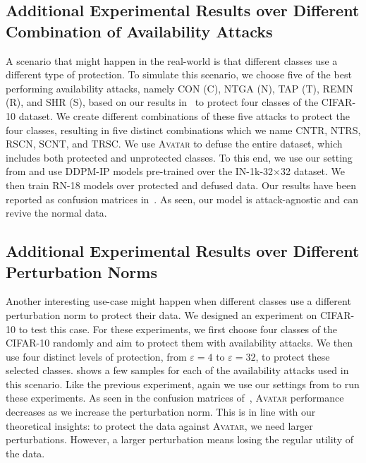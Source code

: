 \documentclass[conference]{IEEEtran}
\theoremstyle{definition}
\theoremstyle{remark}
\theoremstyle{proposition}
\begin{document}
\subsection{Additional Experimental Results over Different Combination of Availability Attacks}

A scenario that might happen in the real-world is that different classes use a different type of protection.
To simulate this scenario, we choose five of the best performing availability attacks, namely CON (C), NTGA (N), TAP (T), REMN (R), and SHR (S), based on our results in~ to protect four classes of the CIFAR-10 dataset.
We create different combinations of these five attacks to protect the four classes, resulting in five distinct combinations which we name CNTR, NTRS, RSCN, SCNT, and TRSC.
We use \textsc{Avatar} to defuse the entire dataset, which includes both protected and unprotected classes.
To this end, we use our setting from  and use DDPM-IP models pre-trained over the IN-1k-32$\times$32 dataset.
We then train RN-18 models over protected and defused data.
Our results have been reported as confusion matrices in~.
As seen, our model is attack-agnostic and can revive the normal data.

\subsection{Additional Experimental Results over Different Perturbation Norms}
Another interesting use-case might happen when different classes use a different perturbation norm to protect their data.
We designed an experiment on CIFAR-10 to test this case.
For these experiments, we first choose four classes of the CIFAR-10 randomly and aim to protect them with availability attacks.
We then use four distinct levels of protection, from $\varepsilon=4$ to $\varepsilon=32$, to protect these selected classes.
 shows a few samples for each of the availability attacks used in this scenario.
Like the previous experiment, again we use our settings from  to run these experiments.
As seen in the confusion matrices of~, \textsc{Avatar} performance decreases as we increase the perturbation norm.
This is in line with our theoretical insights: to protect the data against \textsc{Avatar}, we need larger perturbations. 
However, a larger perturbation means losing the regular utility of the data.
\end{document}
